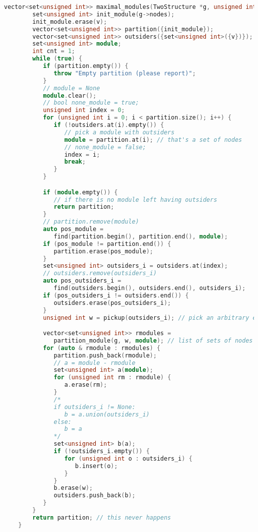 \begin{lstlisting}[language=C++, style=cpp, caption={Defining Maximale Module with C++}, label={lst:cpp-define-maximal-module}, firstnumber=1]
    vector<set<unsigned int>> maximal_modules(TwoStructure *g, unsigned int v) {
        set<unsigned int> init_module(g->nodes);
        init_module.erase(v);
        vector<set<unsigned int>> partition({init_module});
        vector<set<unsigned int>> outsiders({set<unsigned int>({v})});
        set<unsigned int> module;
        int cnt = 1;
        while (true) {
           if (partition.empty()) {
              throw "Empty partition (please report)";
           }
           // module = None
           module.clear();
           // bool none_module = true;
           unsigned int index = 0;
           for (unsigned int i = 0; i < partition.size(); i++) {
              if (!outsiders.at(i).empty()) {
                 // pick a module with outsiders
                 module = partition.at(i); // that's a set of nodes
                 // none_module = false;
                 index = i;
                 break;
              }
           }

           if (module.empty()) {
              // if there is no module left having outsiders
              return partition;
           }
           // partition.remove(module)
           auto pos_module =
              find(partition.begin(), partition.end(), module);
           if (pos_module != partition.end()) {
              partition.erase(pos_module);
           }
           set<unsigned int> outsiders_i = outsiders.at(index);
           // outsiders.remove(outsiders_i)
           auto pos_outsiders_i =
              find(outsiders.begin(), outsiders.end(), outsiders_i);
           if (pos_outsiders_i != outsiders.end()) {
              outsiders.erase(pos_outsiders_i);
           }
           unsigned int w = pickup(outsiders_i); // pick an arbitrary element

           vector<set<unsigned int>> rmodules =
              partition_module(g, w, module); // list of sets of nodes
           for (auto & rmodule : rmodules) {
              partition.push_back(rmodule);
              // a = module - rmodule
              set<unsigned int> a(module);
              for (unsigned int rm : rmodule) {
                 a.erase(rm);
              }
              /*
              if outsiders_i != None:
                 b = a.union(outsiders_i)
              else:
                 b = a
              */
              set<unsigned int> b(a);
              if (!outsiders_i.empty()) {
                 for (unsigned int o : outsiders_i) {
                    b.insert(o);
                 }
              }
              b.erase(w);
              outsiders.push_back(b);
           }
        }
        return partition; // this never happens
    }

\end{lstlisting}

